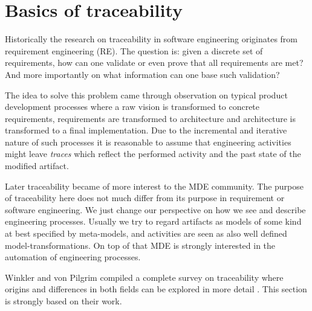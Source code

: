 
\section{Basics of traceability}\label{subsec:Basics.Traceability}
Historically the research on traceability in software engineering originates from requirement engineering (RE). The question is: given a discrete set of requirements, how can one validate or even prove that all requirements are met? And more importantly on what information can one base such validation? 

The idea to solve this problem came through observation on typical product development processes where a raw vision is transformed to concrete requirements, requirements are transformed to architecture and architecture is transformed to a final implementation. Due to the incremental and iterative nature of such processes it is reasonable to assume that engineering activities might leave \textit{traces} which reflect the performed activity and the past state of the modified artifact.

Later traceability became of more interest to the MDE community. The purpose of traceability here does not much differ from its purpose in requirement or software engineering. We just change our perspective on how we see and describe engineering processes. Usually we try to regard artifacts as models of some kind at best specified by meta-models, and activities are seen as also well defined model-transformations. On top of that MDE is strongly interested in the automation of engineering processes.

Winkler and von Pilgrim compiled a complete survey on traceability where origins and differences in both fields  can be explored in more detail \cite{TraceabilitySurvey}. This section is strongly based on their work.

